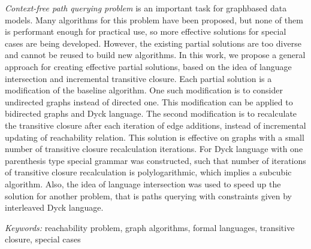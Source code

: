 \textit{Context-free path querying problem} is an important task for graph­based data models. Many algorithms for this problem have been proposed, but none of them is performant enough for practical use, so more effective solutions for special cases are being developed. However, the existing partial solutions are too diverse and cannot be reused to build new algorithms. In this work, we propose a general approach for creating effective partial solutions, based on the idea of language intersection and incremental transitive closure. Each partial solution is a modification of the baseline algorithm. One such modification is to consider undirected graphs instead of directed one. This modification can be applied to bidirected graphs and Dyck language. The second modification is to recalculate the transitive closure after each iteration of edge additions, instead of incremental updating of reachability relation. This solution is effective on graphs with a small number of transitive closure recalculation iterations. For Dyck language with one parenthesis type special grammar was constructed, such that number of iterations of transitive closure recalculation is poly\-logarithmic, which implies a subcubic algorithm. Also, the idea of language intersection was used to speed up the solution for another problem, that is paths querying with constraints given by interleaved Dyck language.

\vspace{1em}

\textit{Keywords:} reachability problem, graph algorithms, formal languages, transitive closure, special cases